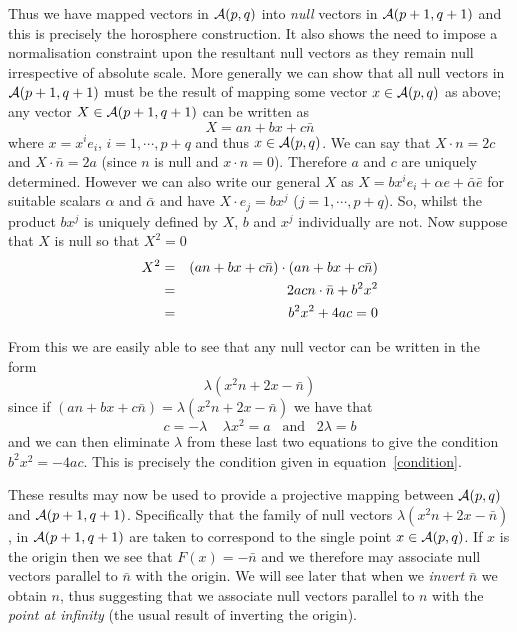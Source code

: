 Thus we have mapped vectors in ${\mathcal{A}}(p,q)$ into \emph{null}
vectors in ${\mathcal{A}}(p+1,q+1)$ and this is precisely the horosphere 
construction. It also shows the need to impose a normalisation
constraint upon the resultant null vectors as they remain null 
irrespective of absolute scale.
More generally we can show that all null vectors in $\mathcal{A}(p+1,q+1)$
must be the result of mapping some vector $x \in \mathcal{A}(p,q)$ as above;
any vector $X \in {\mathcal{A}}(p+1,q+1)$ can be written as
%
\[ X = an + bx + c\bar{n}  \]
%
where $x = x^ie_i$, $i=1,\cdots,p+q$ and thus $x \in \mathcal{A}(p,q)$.
We can say that $X\cdot n = 2c$ and $X\cdot \bar{n}=2a$ (since $n$ is 
null and $x\cdot n = 0$). Therefore $a$
and $c$ are uniquely determined. However we can also write our
general $X$ as  $X=b{x}^ie_i + \alpha e + \bar{\alpha}\bar{e}$ for 
suitable scalars $\alpha$ and $\bar{\alpha}$ and
have $X\cdot e_j= bx^j$ ($j=1,\cdots,p+q$). So, whilst the product
$bx^j$ is uniquely defined by $X$, $b$ and $x^j$ individually are
not. Now suppose that $X$ is null so that $X^2=0$
%
\begin{eqnarray}
X^2 & = &   (an + bx + c\bar{n})\cdot (an + bx + c\bar{n}) \nonumber \\
       & = &  2ac n\cdot \bar{n} + b^2x^2 \nonumber \\
       & = & b^2x^2 + 4ac = 0
       \label{condition}
\end{eqnarray}
%

From this we are easily able to see that any null vector can be
written in the form
%
\begin{equation}
\lambda (x^2n + 2x - \bar{n}) \label{null}
\end{equation} 
%
since if $(an + bx + c\bar{n}) = \lambda(x^2n + 2x -
\bar{n})$ we have that
%
\[c=-\lambda\;\;\;\; \lambda x^2 = a \;\;\;\mbox{and}\;\;\; 2\lambda = b\]
%
and we can then eliminate $\lambda$ from these last two
equations to give the condition $b^2 x^2 = -4ac$. This
is precisely the condition given in
equation~\ref{condition}.

These results may now be used to provide a projective mapping
between ${\mathcal{A}}(p,q)$ and  ${\mathcal{A}}(p+1,q+1)$. Specifically that the
family of null vectors $\lambda(x^2n + 2x - \bar{n})$,
in ${\mathcal{A}}(p+1,q+1)$ are taken to correspond to the
single point $x\in {\mathcal{A}}(p,q)$. If $x$ is the origin
then we see that $F(x) = -\bar{n}$ and we therefore may associate
null vectors parallel to $\bar{n}$ with the origin. 
We will see later that when we \emph{invert} $\bar{n}$ 
we obtain $n$, thus suggesting
that we associate null vectors parallel to $n$ with the 
\emph{point at infinity} (the usual result of inverting the origin).

